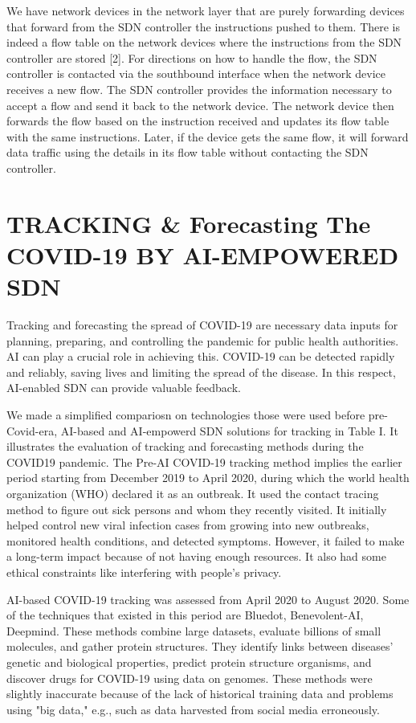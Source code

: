\documentclass[10pt]{article}
\begin{document}
We have network devices in the network layer that are purely forwarding devices that forward from the SDN controller the instructions pushed to them. There is indeed a flow table on the network devices where the instructions from the SDN controller are stored [2]. For directions on how to handle the flow, the SDN controller is contacted via the southbound interface when the network device receives a new flow. The SDN controller provides the information necessary to accept a flow and send it back to the network device. The network device then forwards the flow based on the instruction received and updates its flow table with the same instructions. Later, if the device gets the same flow, it will forward data traffic using the details in its flow table without contacting the SDN controller.

\section{TRACKING \& Forecasting The COVID-19 BY AI-EMPOWERED SDN}
Tracking and forecasting the spread of COVID-19 are necessary data inputs for planning, preparing, and controlling the pandemic for public health authorities. AI can play a crucial role in achieving this. COVID-19 can be detected rapidly and reliably, saving lives and limiting the spread of the disease. In this respect, AI-enabled SDN can provide valuable feedback.

We made a simplified compariosn on technologies those were used before pre-Covid-era, AI-based and AI-empowerd SDN solutions for tracking in Table I. It illustrates the evaluation of tracking and forecasting methods during the COVID19 pandemic. The Pre-AI COVID-19 tracking method implies the earlier period starting from December 2019 to April 2020, during which the world health organization (WHO) declared it as an outbreak. It used the contact tracing method to figure out sick persons and whom they recently visited. It initially helped control new viral infection cases from growing into new outbreaks, monitored health conditions, and detected symptoms. However, it failed to make a long-term impact because of not having enough resources. It also had some ethical constraints like interfering with people's privacy.

AI-based COVID-19 tracking was assessed from April 2020 to August 2020. Some of the techniques that existed in this period are Bluedot, Benevolent-AI, Deepmind. These methods combine large datasets, evaluate billions of small molecules, and gather protein structures. They identify links between diseases' genetic and biological properties, predict protein structure organisms, and discover drugs for COVID-19 using data on genomes. These methods were slightly inaccurate because of the lack of historical training data and problems using "big data," e.g., such as data harvested from social media erroneously.
\end{document}
